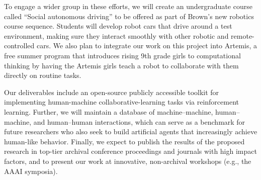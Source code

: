 To engage a wider group in these efforts, we will create an
undergraduate course called ``Social autonomous driving'' to be
offered as part of Brown's new robotics course sequence.  Students
will develop robot cars that drive around a test environment, making
sure they interact smoothly with other robotic and remote-controlled
cars.  We also plan to integrate our work on this project into
Artemis, a free summer program that introduces rising 9th grade girls
to computational thinking by having the Artemis girls teach a robot to
collaborate with them directly on routine tasks.

Our deliverables include an open-source publicly accessible toolkit
for implementing human-machine collaborative-learning tasks via
reinforcement learning. Further, we will maintain a database of
machine--machine, human--machine, and human--human interactions, which can serve as a benchmark for future
researchers who also seek to build artificial agents that increasingly
achieve human-like behavior.
%
Finally, we expect to publish the results of the proposed research in
top-tier archival conference proceedings and journals with high
impact factors, and to present our work at innovative, non-archival
workshops (e.g., the AAAI symposia).

